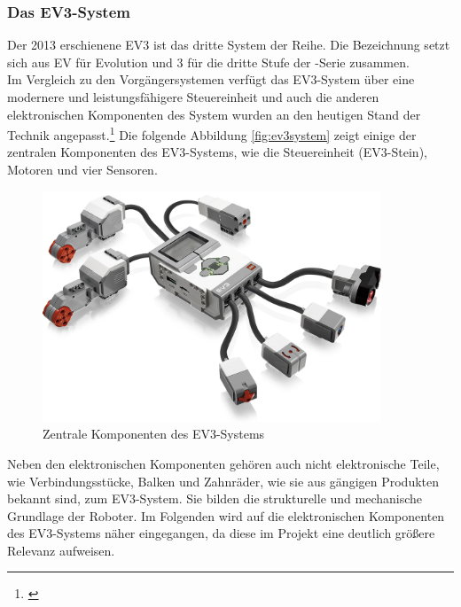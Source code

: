 \subsubsection{Das EV3-System}
Der 2013 erschienene EV3 ist das dritte System der \LM{} Reihe. Die Bezeichnung setzt sich aus EV für Evolution 
und 3 für die dritte Stufe der \LM{}-Serie zusammen. \\
Im Vergleich zu den Vorgängersystemen verfügt das EV3-System über eine modernere und leistungsfähigere Steuereinheit und auch die anderen elektronischen Komponenten des System wurden an den heutigen Stand der Technik 
angepasst.\footnote{\citep[vgl.][Das EV3 Roboter Universum, Seite 22]{Scholz.DasEV3}\label{note24}}
\medskip
\newline
Die folgende Abbildung \eqref{fig:ev3system} zeigt einige der zentralen Komponenten des EV3-Systems, wie die Steuereinheit (EV3-Stein), Motoren und vier Sensoren.
\begin{figure}[ht]
	\centering
	\includegraphics[width=0.90\textwidth]{images/technische_grundlagen/EV3-Overview.png}
	\caption[Zentrale Komponenten des EV3-Systems]{Zentrale Komponenten des EV3-Systems}
	\label{fig:ev3system}
\end{figure}
\newline
Neben den elektronischen Komponenten gehören auch nicht elektronische Teile, wie Verbindungsstücke, Balken und Zahnräder, wie sie aus gängigen \LE{} Produkten bekannt sind, zum EV3-System. Sie bilden die strukturelle und mechanische Grundlage der Roboter.
\medskip
\newline
Im Folgenden wird auf die elektronischen Komponenten des EV3-Systems näher eingegangen, da diese im Projekt eine deutlich größere Relevanz aufweisen.
